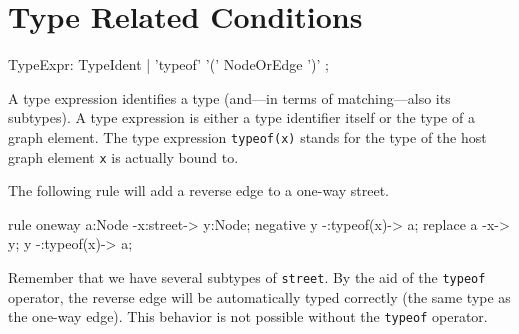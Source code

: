 \section{Type Related Conditions}
\label{typeexpressions}

\begin{rail}
  TypeExpr: TypeIdent | 'typeof' '(' NodeOrEdge ')' ;
\end{rail}
A type expression identifies a type (and---in terms of matching---also its subtypes).
A type expression is either a type identifier itself or the type of a graph element.
The type expression \texttt{typeof(x)} stands for the type of the host graph element \texttt{x} is actually bound to.
\begin{example}
The following rule will add a reverse edge to a one-way street.
\begin{grgen}
rule oneway {
    a:Node -x:street-> y:Node;
    negative {
        y -:typeof(x)-> a;
    }
    replace {
        a -x-> y;
        y -:typeof(x)-> a;
    }
}
\end{grgen}
Remember that we have several subtypes of \texttt{street}. By the aid of the \texttt{typeof} operator, the reverse edge will be automatically typed correctly (the same type as the one-way edge). This behavior is not possible without the \texttt{typeof} operator.
\end{example}

